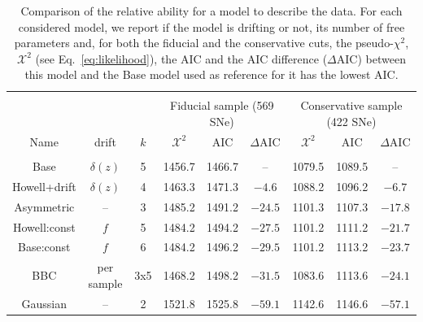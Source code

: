 \documentclass[]{aa} %
\begin{document}
\begin{table}
    \centering
    \caption{Comparison of the relative ability for a model to describe the
    data. For each considered model, we report if the model is drifting or not,
its number of free parameters and, for both the fiducial and the conservative
cuts, the pseudo-$\chi^2$, $\mathcal{X}^2$ (see Eq.~\ref{eq:likelihood}), the AIC
and the AIC difference ($\Delta$AIC) between this model and the Base model used
as reference for it has the lowest AIC.}
    \label{tab:comp}
    \begin{tabular}{c c c  |c c c |  c c c }\hline\hline\\[-0.8em]
        & & & \multicolumn{3}{|c}{Fiducial sample (569 SNe)} & \multicolumn{3}{|c}{Conservative sample (422 SNe)} \\
        
        Name & drift & $k$ &
        $\mathcal{X}^2$ & $\mathrm{AIC}$ & $\Delta \mathrm{AIC}$ &  $\mathcal{X}^2$ & $\mathrm{AIC}$ & $\Delta \mathrm{AIC}$\\[0.15em]
        \hline\\[-0.8em]

        Base & $\delta(z)$ & 5
        & 1456.7 & 1466.7 & -- 
        & 1079.5 & 1089.5 & -- \\[0.15em]

        Howell+drift & $\delta(z)$ & 4
        & 1463.3 & 1471.3 & $-4.6$  %
        & 1088.2 & 1096.2 & $-6.7$ 
        \\[0.15em]

        Asymmetric & -- & 3
        & 1485.2 & 1491.2 & $-24.5$  %
        & 1101.3 & 1107.3 & $-17.8$ 
        \\[0.15em]

        Howell:const & $f$ & 5
        & 1484.2 & 1494.2 & $-27.5$  %
        & 1101.2 & 1111.2 & $-21.7$ 
        \\[0.15em]

        Base:const & $f$ & 6
        & 1484.2 & 1496.2 & $-29.5$  %
        & 1101.2 & 1113.2 & $-23.7$ 
        \\[0.15em]

        BBC & per sample & 3x5
        & 1468.2 & 1498.2 & $-31.5$  %
        & 1083.6 & 1113.6 & $-24.1$ 
        \\[0.15em]

        Gaussian & -- & 2
        & 1521.8 & 1525.8 & $-59.1$  %
        & 1142.6 & 1146.6 & $-57.1$ 
        \\\hline\hline
    \end{tabular}
\end{table}
\end{document}
